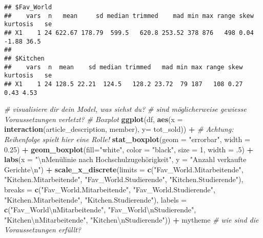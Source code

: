 \documentclass[
]{article}
\newenvironment{Shaded}{\begin{snugshade}}{\end{snugshade}}
\newcommand{\CharTok}[1]{\textcolor[rgb]{0.31,0.60,0.02}{#1}}
\newcommand{\CommentTok}[1]{\textcolor[rgb]{0.56,0.35,0.01}{\textit{#1}}}
\newcommand{\DataTypeTok}[1]{\textcolor[rgb]{0.13,0.29,0.53}{#1}}
\newcommand{\DecValTok}[1]{\textcolor[rgb]{0.00,0.00,0.81}{#1}}
\newcommand{\FloatTok}[1]{\textcolor[rgb]{0.00,0.00,0.81}{#1}}
\newcommand{\KeywordTok}[1]{\textcolor[rgb]{0.13,0.29,0.53}{\textbf{#1}}}
\newcommand{\NormalTok}[1]{#1}
\newcommand{\OperatorTok}[1]{\textcolor[rgb]{0.81,0.36,0.00}{\textbf{#1}}}
\newcommand{\StringTok}[1]{\textcolor[rgb]{0.31,0.60,0.02}{#1}}
\begin{document}
\begin{verbatim}
## $Fav_World
##    vars  n   mean     sd median trimmed    mad min max range skew kurtosis   se
## X1    1 24 622.67 178.79  599.5   620.8 253.52 378 876   498 0.04    -1.88 36.5
## 
## $Kitchen
##    vars  n  mean    sd median trimmed   mad min max range skew kurtosis   se
## X1    1 24 128.5 22.21  124.5   128.2 23.72  79 187   108 0.27     0.43 4.53
\end{verbatim}

\begin{Shaded}
\begin{Highlighting}[]
\CommentTok{# visualisiere dir dein Model, was siehst du? }
\CommentTok{# sind möglicherweise gewiesse Voraussetzungen verletzt?}
\CommentTok{# Boxplot}
\KeywordTok{ggplot}\NormalTok{(df, }\KeywordTok{aes}\NormalTok{(}\DataTypeTok{x =} \KeywordTok{interaction}\NormalTok{(article_description, member), }\DataTypeTok{y=}\NormalTok{ tot_sold)) }\OperatorTok{+}\StringTok{ }
\StringTok{   }\CommentTok{# Achtung: Reihenfolge spielt hier eine Rolle!}
\StringTok{  }\KeywordTok{stat_boxplot}\NormalTok{(}\DataTypeTok{geom =} \StringTok{"errorbar"}\NormalTok{, }\DataTypeTok{width =} \FloatTok{0.25}\NormalTok{) }\OperatorTok{+}
\StringTok{  }\KeywordTok{geom_boxplot}\NormalTok{(}\DataTypeTok{fill=}\StringTok{"white"}\NormalTok{, }\DataTypeTok{color =} \StringTok{"black"}\NormalTok{, }\DataTypeTok{size =} \DecValTok{1}\NormalTok{, }\DataTypeTok{width =} \FloatTok{.5}\NormalTok{) }\OperatorTok{+}
\StringTok{  }\KeywordTok{labs}\NormalTok{(}\DataTypeTok{x =} \StringTok{"}\CharTok{\textbackslash{}n}\StringTok{Menülinie nach Hochschulzugehörigkeit"}\NormalTok{, }\DataTypeTok{y =} \StringTok{"Anzahl verkaufte Gerichte}\CharTok{\textbackslash{}n}\StringTok{"}\NormalTok{) }\OperatorTok{+}\StringTok{ }
\StringTok{  }\KeywordTok{scale_x_discrete}\NormalTok{(}\DataTypeTok{limits =} \KeywordTok{c}\NormalTok{(}\StringTok{"Fav_World.Mitarbeitende"}\NormalTok{, }\StringTok{"Kitchen.Mitarbeitende"}\NormalTok{,}
                              \StringTok{"Fav_World.Studierende"}\NormalTok{, }\StringTok{"Kitchen.Studierende"}\NormalTok{),}
                   \DataTypeTok{breaks =} \KeywordTok{c}\NormalTok{(}\StringTok{"Fav_World.Mitarbeitende"}\NormalTok{, }\StringTok{"Fav_World.Studierende"}\NormalTok{,}
                              \StringTok{"Kitchen.Mitarbeitende"}\NormalTok{,  }\StringTok{"Kitchen.Studierende"}\NormalTok{),}
                   \DataTypeTok{labels =} \KeywordTok{c}\NormalTok{(}\StringTok{"Fav_World}\CharTok{\textbackslash{}n}\StringTok{Mitarbeitende"}\NormalTok{, }\StringTok{"Fav_World}\CharTok{\textbackslash{}n}\StringTok{Studierende"}\NormalTok{,}
                              \StringTok{"Kitchen}\CharTok{\textbackslash{}n}\StringTok{Mitarbeitende"}\NormalTok{,  }\StringTok{"Kitchen}\CharTok{\textbackslash{}n}\StringTok{Studierende"}\NormalTok{)) }\OperatorTok{+}
\StringTok{  }\NormalTok{mytheme }\CommentTok{# wie sind die Voraussetzungen erfüllt?}
\end{Highlighting}
\end{Shaded}
\end{document}
